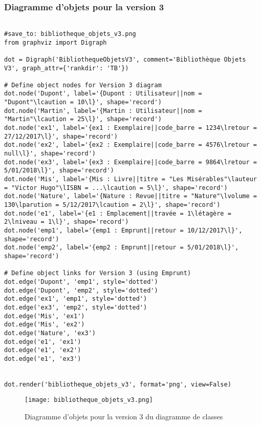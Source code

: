\documentclass{article}
\begin{document}
\subsubsection{Diagramme d'objets pour la version 3}

\begin{verbatim}

#save_to: bibliotheque_objets_v3.png
from graphviz import Digraph

dot = Digraph('BibliothequeObjetsV3', comment='Bibliothèque Objets V3', graph_attr={'rankdir': 'TB'})

# Define object nodes for Version 3 diagram
dot.node('Dupont', label='{Dupont : Utilisateur||nom = "Dupont"\lcaution = 10\l}', shape='record')
dot.node('Martin', label='{Martin : Utilisateur||nom = "Martin"\lcaution = 25\l}', shape='record')
dot.node('ex1', label='{ex1 : Exemplaire||code_barre = 1234\lretour = 27/12/2017\l}', shape='record')
dot.node('ex2', label='{ex2 : Exemplaire||code_barre = 4576\lretour = null\l}', shape='record')
dot.node('ex3', label='{ex3 : Exemplaire||code_barre = 9864\lretour = 5/01/2018\l}', shape='record')
dot.node('Mis', label='{Mis : Livre||titre = "Les Misérables"\lauteur = "Victor Hugo"\lISBN = ...\lcaution = 5\l}', shape='record')
dot.node('Nature', label='{Nature : Revue||titre = "Nature"\lvolume = 130\lparution = 5/12/2017\lcaution = 2\l}', shape='record')
dot.node('e1', label='{e1 : Emplacement||travée = 1\létagère = 2\lniveau = 1\l}', shape='record')
dot.node('emp1', label='{emp1 : Emprunt||retour = 10/12/2017\l}', shape='record')
dot.node('emp2', label='{emp2 : Emprunt||retour = 5/01/2018\l}', shape='record')

# Define object links for Version 3 (using Emprunt)
dot.edge('Dupont', 'emp1', style='dotted')
dot.edge('Dupont', 'emp2', style='dotted')
dot.edge('ex1', 'emp1', style='dotted')
dot.edge('ex3', 'emp2', style='dotted')
dot.edge('Mis', 'ex1')
dot.edge('Mis', 'ex2')
dot.edge('Nature', 'ex3')
dot.edge('e1', 'ex1')
dot.edge('e1', 'ex2')
dot.edge('e1', 'ex3')


dot.render('bibliotheque_objets_v3', format='png', view=False)
\end{verbatim}

\begin{figure}[H]
    \centering
    \texttt{[image: bibliotheque\_objets\_v3.png]}
    \caption{Diagramme d'objets pour la version 3 du diagramme de classes}
    \label{fig:bibliotheque_objets_v3}
\end{figure}
\end{document}
